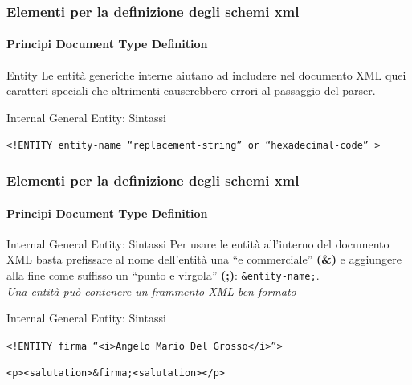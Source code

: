 \begin{frame}
    \frametitle{Elementi per la definizione degli schemi xml}
    \framesubtitle{Principi Document Type Definition}
    \addtocounter{nframe}{1}

    \begin{block}{Entity}
     Le entità generiche interne aiutano ad includere nel documento XML quei caratteri speciali che altrimenti causerebbero errori al passaggio del parser.
    \end{block}

    \begin{block}{Internal General Entity: Sintassi}
    \begin{center}\texttt{<!ENTITY entity-name ``replacement-string'' or ``hexadecimal-code'' >}\end{center}
    \end{block}

\end{frame}


\begin{frame}
    \frametitle{Elementi per la definizione degli schemi xml}
    \framesubtitle{Principi Document Type Definition}
    \addtocounter{nframe}{1}

    \begin{block}{Internal General Entity: Sintassi}
        Per usare le entità all'interno del documento XML basta prefissare al nome dell'entità una ``e commerciale'' \textbf{(\&)} e aggiungere alla fine come suffisso un ``punto e virgola'' \textbf{(;)}:  \texttt{\&entity-name;}.
        \\ \textit{Una entità può contenere un frammento XML ben formato}
    \end{block}

    \begin{block}{Internal General Entity: Sintassi}
    \begin{center}\texttt{<!ENTITY firma ``<i>Angelo Mario Del Grosso</i>''>}\end{center}
    \begin{center}\texttt{<p><salutation>\&firma;<salutation></p>}\end{center}
    \end{block}

\end{frame}

